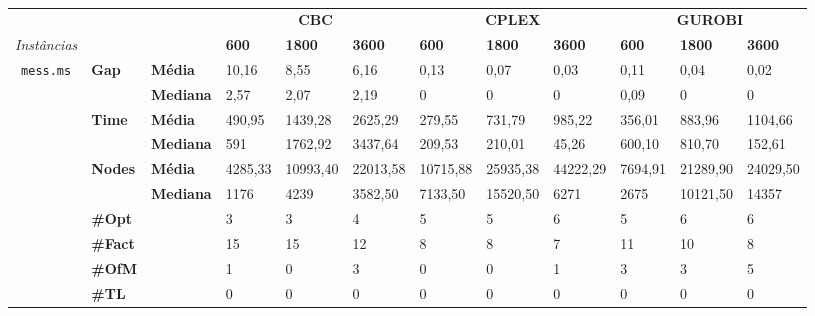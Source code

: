 
\begin{table}[]
	\begin{adjustbox}{angle=90}
	\begin{tabular}{cll|lll|lll|lll}
	& & & \multicolumn{3}{c}{\textbf{CBC}} & \multicolumn{3}{c}{\textbf{CPLEX}} & \multicolumn{3}{c}{\textbf{GUROBI}} 	\\\textit{Instâncias} & & & \textbf{600} & \textbf{1800} & \textbf{3600} & \textbf{600} & \textbf{1800} & \textbf{3600} & \textbf{600} & \textbf{1800} & \textbf{3600} \\
\hline
\multirow{7}{*}{\texttt{mess.ms}} & \multirow{2}{*}{\textbf{Gap}} & \textbf{Média} & 10,16 & 8,55 & 6,16 & 0,13 & 0,07 & 0,03 & 0,11 & 0,04 & 0,02 \\
 & & \textbf{Mediana} & 2,57 & 2,07 & 2,19 & 0 & 0 & 0 & 0,09 & 0 & 0 \\
\cline{2-12}
 & \multirow{2}{*}{\textbf{Time}} & \textbf{Média} & 490,95 & 1439,28 & 2625,29 & 279,55 & 731,79 & 985,22 & 356,01 & 883,96 & 1104,66 \\
 & & \textbf{Mediana} & 591 & 1762,92 & 3437,64 & 209,53 & 210,01 & 45,26 & 600,10 & 810,70 & 152,61 \\
\cline{2-12}
 & \multirow{2}{*}{\textbf{Nodes}} & \textbf{Média} & 4285,33 & 10993,40 & 22013,58 & 10715,88 & 25935,38 & 44222,29 & 7694,91 & 21289,90 & 24029,50 \\
 & & \textbf{Mediana} & 1176 & 4239 & 3582,50 & 7133,50 & 15520,50 & 6271 & 2675 & 10121,50 & 14357 \\
\cline{2-12}
 & \textbf{\#Opt} & & 3 & 3 & 4 & 5 & 5 & 6 & 5 & 6 & 6 \\
 & \textbf{\#Fact} & & 15 & 15 & 12 & 8 & 8 & 7 & 11 & 10 & 8 \\
 & \textbf{\#OfM} & & 1 & 0 & 3 & 0 & 0 & 1 & 3 & 3 & 5 \\
 & \textbf{\#TL} & & 0 & 0 & 0 & 0 & 0 & 0 & 0 & 0 & 0 \\
	\end{tabular}
	\end{adjustbox}
	\label{cflp:tab:0}
	\caption{}
\end{table}

